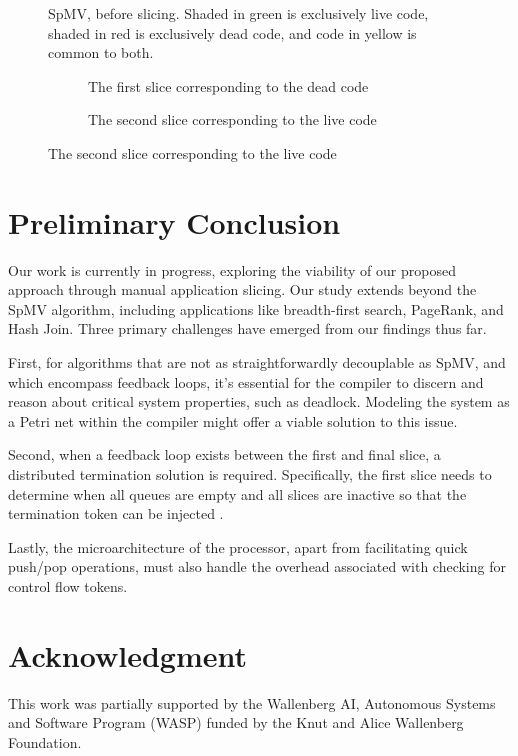 \documentclass{acaces}
\begin{document}
\begin{figure}[ht]
  \centering
  
  \caption{SpMV, before slicing. Shaded in green is exclusively live code, shaded in red is exclusively dead code, and code in yellow is common to both. }
  \label{fig:spmv}
\end{figure}

\begin{figure}[ht]
  \centering

  \begin{subfigure}{1.0\textwidth}
    \centering
    
    \caption{The first slice corresponding to the dead code}
    \label{fig:firstSlice}
  \end{subfigure}

  \begin{subfigure}{1.0\textwidth}
    \centering
    
    \caption{The second slice corresponding to the live code}
    \label{fig:secondSlice}
  \end{subfigure}

\end{figure}

\section{Preliminary Conclusion}

Our work is currently in progress, exploring the viability of our proposed approach through manual application slicing.
Our study extends beyond the SpMV algorithm, including applications like breadth-first search, PageRank, and Hash Join.
Three primary challenges have emerged from our findings thus far.

First, for algorithms that are not as straightforwardly decouplable as SpMV,
and which encompass feedback loops,
it's essential for the compiler to discern and reason about critical system properties, such as deadlock.
Modeling the system as a Petri net within the compiler might offer a viable solution to this issue.

Second, when a feedback loop exists between the first and final slice, a distributed termination solution is required.
Specifically, the first slice needs to determine when all queues are empty and all slices are inactive so that the termination token can be injected \cite{Dijkstra1983}.

Lastly, the microarchitecture of the processor, apart from facilitating quick push/pop operations, must also handle the overhead associated with checking for control flow tokens.

\section{Acknowledgment}

This work was partially supported by the Wallenberg AI, Autonomous Systems and Software Program (WASP)
funded by the Knut and Alice Wallenberg Foundation.


\end{document}
